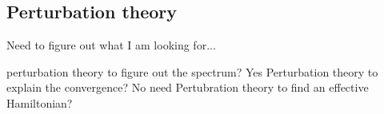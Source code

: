 \documentclass{article}
\begin{document}
\begin{comment}
    

Then,
\begin{equation}
    H|\psi(0)\rangle=|q_1\rangle(\frac{2+q_1}{\sqrt{w}})\sum_jc_j|e_j\rangle+|q_2\rangle(\frac{2+q_2}{\sqrt{1-w}})\sum_jc_j'|e_j\rangle
\end{equation}
or more generally,
\begin{equation}
    |\psi(t)\rangle=|q_1\rangle(\frac{2+q_1}{\sqrt{w}})\sum_jc_j|e_j\rangle+|q_2\rangle(\frac{2+q_2}{\sqrt{1-w}})\sum_jc_j'|e_j\rangle
\end{equation}

which is no longer separable, and by its factorizability by $|q_1\rangle$ and $|q_2\rangle$, we understand that for all $t$,
\begin{equation}
    |\psi(t)\rangle=\frac{1}{\sqrt{N}}(s_1|q_1\rangle|E_1(t)\rangle+s_2|q_2\rangle|E_2(t)\rangle)
\end{equation}
This means that the Schmidt decomposition of our system+env always has 2 nonzeros schmidt weights at most. But this decomposition (ie in terms of 2 states $|q_i\rangle |E_j\rangle$) is not immediately the 2 schmidt states. Indeed, Schmidt 1 starts up as $|\psi\rangle$ and evolves to something with most of its weight in a factor in from of $|q_1\rangle|E_1\rangle$. But of note, our pure state starts with nonzero value in 200+200 total eigenstates, the Schmidt states share theses with each other, 200 each. (Need to do a part where we look closer at evolution, see black board image.)

Note, $|E_i\rangle=\sum_jc_{ji}(t)|e_j\rangle$.
\end{comment}

\begin{comment}
Note that the weight in from of both states are equal if,
    \begin{equation}
        q_1=2(\frac{\sqrt{w}}{\sqrt{1-w}}-1)+q_2\frac{\sqrt{w}}{\sqrt{1-w}}
    \end{equation}
\end{comment}



\subsection{Perturbation theory}

Need to figure out what I am looking for...

perturbation theory to figure out the spectrum? Yes
Perturbation theory to explain the convergence? No need
Pertubration theory to find an effective Hamiltonian?
\end{document}
